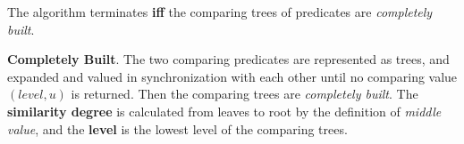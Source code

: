 \begin{comment}
	\item The optimal combination
	
		In formula \ref{eq:DecisionMiddleSet}, $(-\infty,0)$ and $(l-1,u)$ are excluded from \textit{decision middle set} $M_{ds}$. The cardinality $m$ of $M_{ds}$ will affect the \textit{middle result} $M_r=(l-1,M_v)$, since $M_v$ is monotonic increase on $m$.  $(-\infty,0)$ means two predicates are not comparable and $(l-1,u)$ means similarity of two predicates are not defined in level $l-1$. Thus, the combination with more comparable pairs of predicates and more pairs of predicates with defined similarity has precedent \textit{middle result}.
		
	\item similarity between credit value
	
		Credit value $c^a$ and $c^b$ are the trust degrees of fuzzy rules within head $p_a$ and $p_b$, respectively. They are values in unit interval $[0,1]$. We define the distance between 
$c^a$ and $c^b$ by $1-norm$, which is $\lvert c^a-c^b \rvert$. The similarity between them is  $1- \lvert c^a - c^b  \rvert$. $c^a$ and $c^b$ are considered as a special pair of combinations, whose similarity is counted into the middle result of similarity between $p_a$ and $p_b$.  
	\end{itemize}
	
\item The termination of algorithm
	
	For any comparing pair $(p_i^a,p_j^b)$ from children of $p_a$ and $p_b$, if $Sim(p_i^a,p_j^b)=(l-1,u)$, it means that $p_i^a$ and $p_j^b$ have the same type but the similarity degree have not been defined directly in the RFuzzy program, and it could be reached by expanding them according to certain rules. The expanding procedure could be continued until both comparing predicates are atomic, which makes the algorithm terminate.
\end{enumerate} 

\end{comment}

The algorithm terminates \textbf{iff} the comparing trees of predicates are \textit{completely built}.

\begin{defin} \textbf{Completely Built}.
The two comparing predicates are represented as trees, and expanded and valued in synchronization with each other until no comparing value $(level,u)$ is returned. Then the comparing trees are \textit {completely built}. The \textbf{similarity degree} is calculated from leaves to root by the definition of \textit{middle value}, and the \textbf{level} is the lowest level of the comparing trees.
\end{defin}

